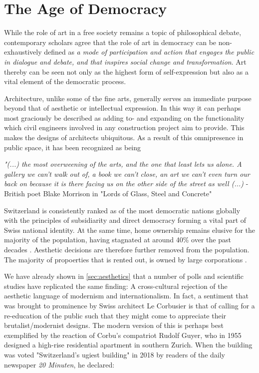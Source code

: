 \documentclass{article}
\begin{document}
\clearpage
\section{The Age of Democracy}
\label{sec:democracy}

\begin{multicols}{2}

While the role of art in a free society remains a topic of philosophical debate, contemporary scholars agree that the role of art in democracy can be non-exhaustively defined as \textit{a mode of participation and action that engages the public in dialogue and debate, and that inspires social change and transformation}. Art thereby can be seen not only as the highest form of self-expression but also as a vital element of the democratic process.

Architecture, unlike some of the fine arts, generally serves an immediate purpose beyond that of aesthetic or intellectual expression. In this way it can perhaps most graciously be described as adding to- and expanding on the functionality which civil engineers involved in any construction project aim to provide. This makes the designs of architects ubiquitous. As a result of this omnipresence in public space, it has been recognized as being

\textit{"(...) the most overweening of the arts, and the one that least lets us alone. A gallery we can't walk out of, a book we can't close, an art we can't even turn our back on because it is there facing us on the other side of the street as well (...)} - British poet Blake Morrison in "Lords of Glass, Steel and Concrete" \cite{morrison_lords_1982}

Switzerland is consistently ranked as of the most democratic nations globally \cite{noauthor_economist_2023} with the principles of subsidiarity and direct democracy forming a vital part of Swiss national identity. At the same time, home ownership remains elusive for the majority of the population, having stagnated at around 40\% over the past decades \cite{noauthor_home_2022}. Aesthetic decisions are therefore further removed from the population. The majority of propoerties that is rented out, is owned by large corporations \cite{noauthor_wem_nodate}.

We have already shown in \cref{sec:aesthetics} that a number of polls and scientific studies have replicated the same finding: A cross-cultural rejection of the aesthetic language of modernism and internationalism. In fact, a sentiment that was brought to prominence by Swiss architect Le Corbusier is that of calling for a re-education of the public such that they might come to appreciate their brutalist/modernist designs. The modern version of this is perhaps best exemplified by the reaction of Corbu's compatriot Rudolf Guyer, who in 1955 designed a high-rise residential apartment in southern Zurich. When the building was voted "Switzerland's ugiest building" in 2018 by readers of the daily newspaper \textit{20 Minuten}, he declared:


\end{multicols}
\end{document}
